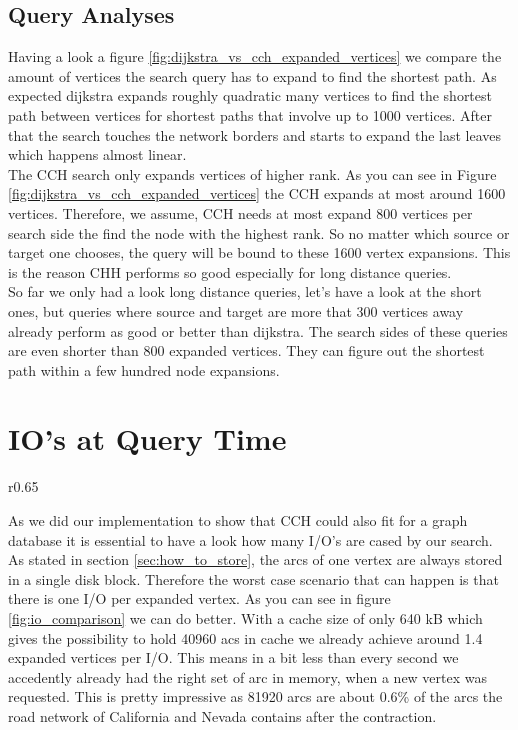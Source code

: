 \subsection{Query Analyses}

Having a look a figure \ref{fig:dijkstra_vs_cch_expanded_vertices} we compare the amount of vertices the search query has to expand to find the shortest path. As expected dijkstra expands roughly quadratic many vertices to find the shortest path between vertices for shortest paths that involve up to 1000 vertices.
After that the search touches the network borders and starts to expand the last leaves which happens almost linear.\\
The CCH search only expands vertices of higher rank. As you can see in Figure \ref{fig:dijkstra_vs_cch_expanded_vertices} the CCH expands at most around 1600 vertices. Therefore, we assume, CCH needs at most expand 800 vertices per search side the find the node with the highest rank. So no matter which source or target one chooses, the query will be bound to these 1600 vertex expansions.
This is the reason CHH performs so good especially for long distance queries.
\\
So far we only had a look long distance queries, let's have a look at the short ones, but queries where source and target are more that 300 vertices away already perform as good or better than dijkstra. The search sides of these queries are even shorter than 800 expanded vertices. They can figure out the shortest path within a few hundred node expansions.



\section{IO's at Query Time}

\begin{wrapfigure}{r}{0.65\textwidth}    
    
    \caption{I/O's over Expanded Vertices for 40kB cache size per search side.}
    \label{fig:io_comparison}
\end{wrapfigure}

As we did our implementation to show that CCH could also fit for a graph database it is essential to have a look how many I/O's are cased by our search. As stated in section \ref{sec:how_to_store}, the arcs of one vertex are always stored in a single disk block. Therefore the worst case scenario that can happen is that there is one I/O per expanded vertex.
As you can see in figure \ref{fig:io_comparison} we can do better. With a cache size of only 640 kB which gives the possibility to hold 40960 acs in cache we already achieve around 1.4 expanded vertices per I/O. This means in a bit less than every second we accedently already had the right set of arc in memory, when a new vertex was requested. This is pretty 
impressive as 81920 arcs are about 0.6\%  of the arcs the road network of California and Nevada contains after the contraction.


